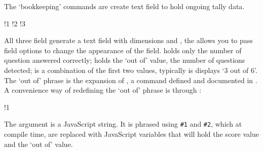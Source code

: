 \documentclass{article}
\begin{document}
The `bookkeeping' commands are create text field to hold ongoing tally data.
\bVerb{}%
\setlength\aebscratch{\bxSize}%
\def\1{\makebox[0pt][l]{\hspace{\aebscratch}\enspace\makebox[0pt][l]{\hspace{.5in}\enspace\normalfont(score field)}\sField[\textSize{7}]{.5in}{9bp}}}%
\def\2{\makebox[0pt][l]{\hspace{\aebscratch}\enspace\makebox[0pt][l]{\hspace{.5in}\enspace\normalfont(`out of' field)}\ooField[\textSize{7}]{.5in}{9bp}}}%
\def\3{\makebox[0pt][l]{\hspace{\aebscratch}\enspace\makebox[0pt][l]{\hspace{.5in}\enspace\normalfont(combined score field)}\sooField[\textSize{7}]{.5in}{9bp}}}%
\begin{dCmd}[commandchars=!()]{\bxSize}
!1
!2
!3
\end{dCmd}
\eVerb All three field generate a text field with dimensions 
and , the  allows you to pass  field
options to change the appearance of the field.  holds only the number of question answered correctly;
 holds the `out of' value, the number of questions detected;  is a combination of
the first two values, typically is displays `3 out of 6'. The `out of' phrase is the expansion of , a command
defined and documented in . A convenience way of redefining the `out of' phrase is through :
\bVerb{}%
\setlength\aebscratch{\bxSize}%
\def\1{\makebox[0pt][l]{\hspace{\aebscratch}\enspace\normalfont(default definition)}}%
\begin{dCmd}[commandchars=!()]{\bxSize}
!1
\end{dCmd}
\eVerb The argument  is a JavaScript string. It is phrased using \texttt{\#1} and \texttt{\#2}, which at
compile time, are replaced with JavaScript variables that will hold the score value and the `out of' value.
\end{document}
